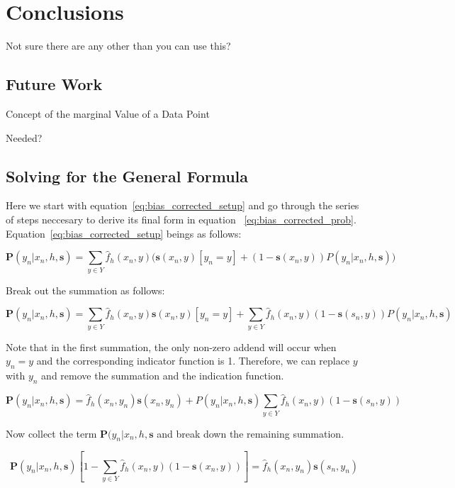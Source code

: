 \documentclass[twoside]{article}
\begin{document}
\section{Conclusions}

Not sure there are any other than you can use this?

\subsection{Future Work}

Concept of the marginal Value of a Data Point

Needed?

\begin{appendices}

\section{Solving for the General Formula}
\label{appendix:solving}

Here we start with equation~\eqref{eq:bias_corrected_setup} and go through the series of steps neccesary to derive its final form in equation ~\eqref{eq:bias_corrected_prob}. Equation~\eqref{eq:bias_corrected_setup} beings as follows:

\[\mathbf{P}(y_n|x_n,h,\mathbf{s})=\sum_{y \in Y}\hat{f}_h(x_n,y)\big(\mathbf{s}(x_n,y)\left [y_n = y\right ] + (1-\mathbf{s}(x_n,y))P(y_n|x_n,h,\mathbf{s})\big)\]

Break out the summation as follows:

\[\mathbf{P}(y_n|x_n,h,\mathbf{s})=\sum_{y \in Y}\hat{f}_h(x_n,y)\mathbf{s}(x_n,y)\left [y_n = y\right ] +\sum_{y \in Y}\hat{f}_h(x_n,y)(1-\mathbf{s}(s_n,y))P(y_n|x_n,h,\mathbf{s})\]

Note that in the first summation, the only non-zero addend will occur when \(y_n = y\) and the corresponding indicator function is 1. Therefore, we can replace \(y\) with \(y_n\) and remove the summation and the indication function.

\[\mathbf{P}(y_n|x_n,h,\mathbf{s})=\hat{f}_h(x_n,y_n)\mathbf{s}(x_n,y_n) +P(y_n|x_n,h,\mathbf{s})\sum_{y \in Y}\hat{f}_h(x_n,y)(1-\mathbf{s}(s_n,y))\]

Now collect the term \(\mathbf{P}(y_n|x_n,h,\mathbf{s}\) and break down the remaining summation.

\[\mathbf{P}(y_n|x_n,h,\mathbf{s})\left [ 1 - \sum_{y \in Y}\hat{f}_h(x_n,y)(1-\mathbf{s}(x_n,y)) \right ]=\hat{f}_h(x_n,y_n)\mathbf{s}(s_n,y_n) \]


\end{appendices}
\end{document}
